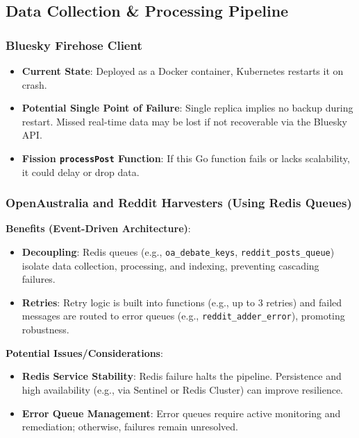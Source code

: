 \documentclass[]{article}
\numberwithin{equation}{section}
\begin{document}
\subsection*{Data Collection \& Processing Pipeline}

\subsubsection*{Bluesky Firehose Client}
\begin{itemize}
  \item \textbf{Current State}: Deployed as a Docker container, Kubernetes restarts it on crash.
  \item \textbf{Potential Single Point of Failure}: Single replica implies no backup during restart. Missed real-time data may be lost if not recoverable via the Bluesky API.
  \item \textbf{Fission \texttt{processPost} Function}: If this Go function fails or lacks scalability, it could delay or drop data.
\end{itemize}

\subsubsection*{OpenAustralia and Reddit Harvesters (Using Redis Queues)}

\textbf{Benefits (Event-Driven Architecture)}:
\begin{itemize}
  \item \textbf{Decoupling}: Redis queues (e.g., \texttt{oa\_debate\_keys}, \texttt{reddit\_posts\_queue}) isolate data collection, processing, and indexing, preventing cascading failures.
  \item \textbf{Retries}: Retry logic is built into functions (e.g., up to 3 retries) and failed messages are routed to error queues (e.g., \texttt{reddit\_adder\_error}), promoting robustness.
\end{itemize}

\textbf{Potential Issues/Considerations}:
\begin{itemize}
  \item \textbf{Redis Service Stability}: Redis failure halts the pipeline. Persistence and high availability (e.g., via Sentinel or Redis Cluster) can improve resilience.
  \item \textbf{Error Queue Management}: Error queues require active monitoring and remediation; otherwise, failures remain unresolved.
\end{itemize}
\end{document}
